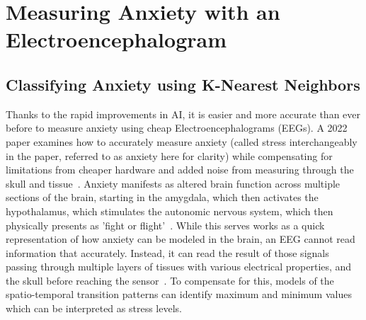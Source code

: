 \documentclass[journal]{IEEEtran}
\begin{document}
\section{Measuring Anxiety with an Electroencephalogram}
\subsection{Classifying Anxiety using K-Nearest Neighbors}
Thanks to the rapid improvements in AI, it is easier and more accurate than ever before to measure anxiety using cheap Electroencephalograms (EEGs). A 2022 paper examines how to accurately measure anxiety (called stress interchangeably in the paper, referred to as anxiety here for clarity) while compensating for limitations from cheaper hardware and added noise from measuring through the skull and tissue~\cite{ChatterjeeDebatri2023Doms}. Anxiety manifests as altered brain function across multiple sections of the brain, starting in the amygdala, which then activates the hypothalamus, which stimulates the autonomic nervous system, which then physically presents as 'fight or flight'~\cite[pg.~2]{ChatterjeeDebatri2023Doms}. While this serves works as a quick representation of how anxiety can be modeled in the brain, an EEG cannot read information that accurately. Instead, it can read the result of those signals passing through multiple layers of tissues with various electrical properties, and the skull before reaching the sensor~\cite[pg.~2]{ChatterjeeDebatri2023Doms}. To compensate for this, models of the spatio-temporal transition patterns can identify maximum and minimum values which can be interpreted as stress levels.
\end{document}
